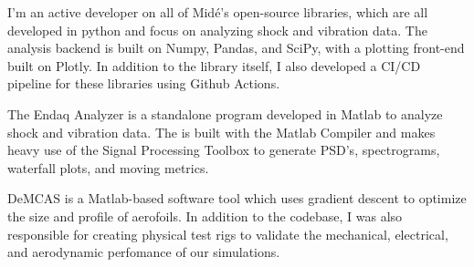 \documentclass[letterpaper]{deedy-resume} %
\begin{document}
\sectionspace %


I'm an active developer on all of Midé's open-source libraries, which are all developed in python and focus on analyzing shock and vibration data.  The analysis backend is built on Numpy, Pandas, and SciPy, with a plotting front-end built on Plotly.  In addition to the library itself, I also developed a CI/CD pipeline for these libraries using Github Actions.

\sectionspace %



The Endaq Analyzer is a standalone program developed in Matlab to analyze shock and vibration data.  The is built with the Matlab Compiler and makes heavy use of the Signal Processing Toolbox to generate PSD's, spectrograms, waterfall plots, and moving metrics.

\sectionspace %



DeMCAS is a Matlab-based software tool which uses gradient descent to optimize the size and profile of aerofoils.  In addition to the codebase, I was also responsible for creating physical test rigs to validate the mechanical, electrical, and aerodynamic perfomance of our simulations.

\sectionspace %

%
%
%
\end{document}
